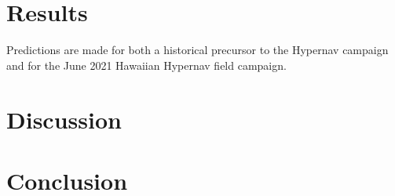 \documentclass{ametsocV5}
\begin{document}
\section{Results}
Predictions are made for both a historical precursor to the Hypernav campaign and for the June 2021 Hawaiian Hypernav field campaign. 


\section{Discussion}

\section{Conclusion}

%
%
%


%



\end{document}
